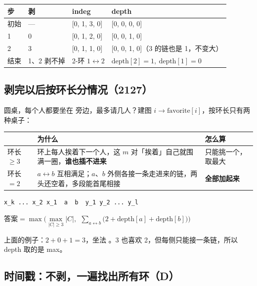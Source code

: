 \begin{center}\small
\begin{tabular}{@{}l l l l@{}}
\toprule
\textbf{步} & \textbf{剥} & \textbf{indeg} & \textbf{depth}\\
\midrule
初始 & — & [0, 1, 3, 0] & [0, 0, 0, 0]\\
1 & 0 & [0, 1, 2, 0] & [0, 0, 1, 0]\\
2 & 3 & [0, 1, 1, 0] & [0, 0, 1, 0]（3 的链也是 1，不变大）\\
结束 & 1、2 剥不掉 & 2-环 $1 \leftrightarrow 2$ & $\text{depth}[2] = 1,\ \text{depth}[1] = 0$\\
\bottomrule
\end{tabular}
\end{center}

\subsection{剥完以后按环长分情况（2127）}

圆桌，每个人都要坐在  旁边，最多请几人？建图 $i \to \text{favorite}[i]$，按环长只有两种桌子：

\begin{tabularx}{\linewidth}{@{}l X l@{}}
\toprule
& \textbf{为什么} & \textbf{怎么算}\\
\midrule
环长 $\ge 3$ & 环上每人挨着下一个人，这 $m$ 对「挨着」自己就围满一圈，\textbf{谁也插不进来} & 只能挑一个，取最大\\
环长 $= 2$ & $a \leftrightarrow b$ 互相满足；$a$、$b$ 外侧各接一条走进来的链，两头还空着，多段能首尾相接 & \textbf{全部加起来}\\
\bottomrule
\end{tabularx}

\vspace{2pt}
\begin{center}
\begin{BVerbatim}[fontsize=\small]
x_k ... x_2 x_1  a  b  y_1 y_2 ... y_l
\end{BVerbatim}
\qquad
$\text{答案} = \max\Big(\max\limits_{|C| \ge 3} |C|,\ \ \sum\limits_{a \leftrightarrow b} \big(2 + \text{depth}[a] + \text{depth}[b]\big)\Big)$
\end{center}
上面的例子：$2 + 0 + 1 = 3$，坐法 。3 也喜欢 2，但每侧只能接一条链，所以 depth 取的是 max。

\subsection{时间戳：不剥，一遍找出所有环（D）}

